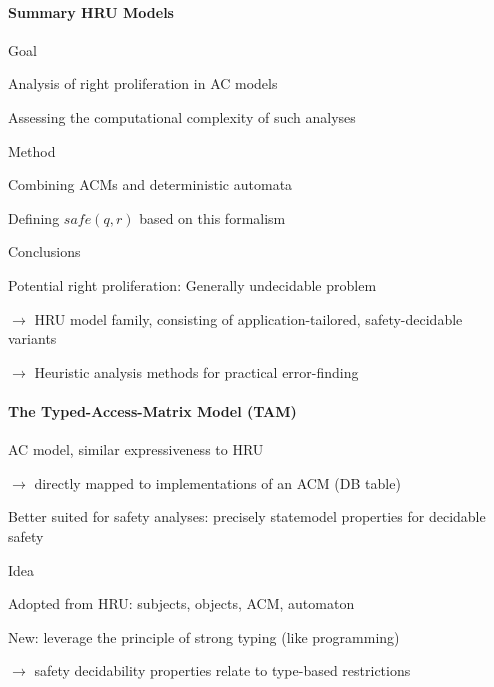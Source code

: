 \documentclass[a4paper]{article}
\begin{document}
\begin{multicols}{3}
    \paragraph{Summary HRU Models}
    Goal
    \begin{itemize*}
        \item Analysis of right proliferation in AC models
        \item Assessing the computational complexity of such analyses
    \end{itemize*}

    Method
    \begin{itemize*}
        \item Combining ACMs and deterministic automata
        \item Defining $safe(q,r)$ based on this formalism
    \end{itemize*}

    Conclusions
    \begin{itemize*}
        \item Potential right proliferation: Generally undecidable problem
        \item[$\rightarrow$] HRU model family, consisting of application-tailored, safety-decidable variants
        \item[$\rightarrow$] Heuristic analysis methods for practical error-finding
    \end{itemize*}

    \paragraph{The Typed-Access-Matrix Model (TAM)}
    \begin{itemize*}
        \item AC model, similar expressiveness to HRU
        \item[$\rightarrow$] directly mapped to implementations of an ACM (DB table)
        \item Better suited for safety analyses: precisely statemodel properties for decidable safety
    \end{itemize*}

    Idea
    \begin{itemize*}
        \item Adopted from HRU: subjects, objects, ACM, automaton
        \item New: leverage the principle of strong typing (like programming)
        \item[$\rightarrow$] safety decidability properties relate to type-based restrictions
    \end{itemize*}


\end{multicols}
\end{document}
